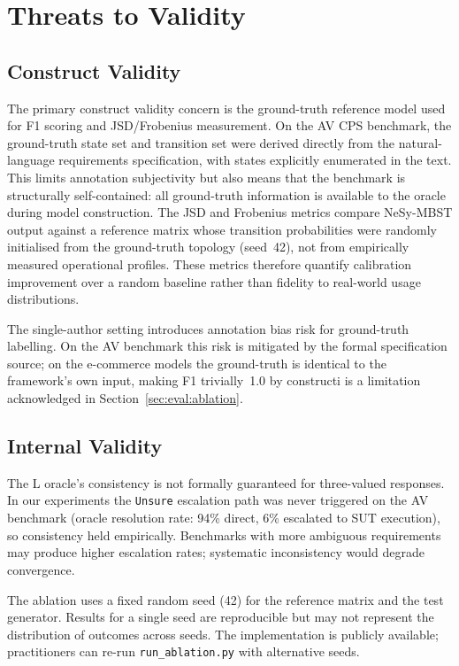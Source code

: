 
\section{Threats to Validity}%
\label{sec:threats}

\subsection{Construct Validity}

The primary construct validity concern is the ground-truth reference
model used for F1 scoring and JSD/Frobenius measurement.  On the AV
CPS benchmark, the ground-truth state set and transition set were
derived directly from the natural-language requirements specification,
with states explicitly enumerated in the text.  This limits annotation
subjectivity but also means that the benchmark is structurally
self-contained: all ground-truth information is available to the oracle
during model construction.  The JSD and Frobenius metrics compare
NeSy-MBST output against a reference matrix whose transition
probabilities were randomly initialised from the ground-truth topology
(seed~42), not from empirically measured operational profiles.  These
metrics therefore quantify calibration improvement over a random
baseline rather than fidelity to real-world usage distributions.

The single-author setting introduces annotation bias risk for
ground-truth labelling.  On the AV benchmark this risk is mitigated by
the formal specification source; on the e-commerce models the
ground-truth is identical to the framework's own input, making F1
trivially~1.0 by constructi is a limitation acknowledged in
Section~\ref{sec:eval:ablation}.

\subsection{Internal Validity}

The L\* oracle's consistency is not formally guaranteed for
three-valued responses.  In our experiments the \texttt{Unsure}
escalation path was never triggered on the AV benchmark (oracle
resolution rate: 94\% direct, 6\% escalated to SUT execution), so
consistency held empirically.  Benchmarks with more ambiguous
requirements may produce higher escalation rates; systematic
inconsistency would degrade convergence.

The ablation uses a fixed random seed (42) for the reference matrix and
the test generator.  Results for a single seed are reproducible but may
not represent the distribution of outcomes across seeds.  The
implementation is publicly available; practitioners can re-run
\texttt{run\_ablation.py} with alternative seeds.

